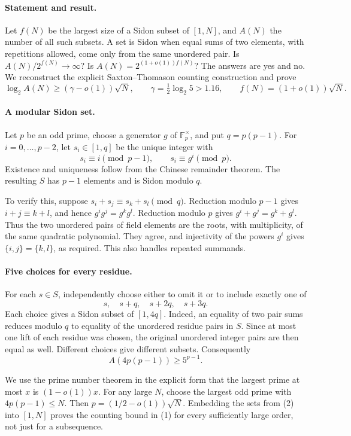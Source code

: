 \paragraph{Statement and result.}
Let \(f(N)\) be the largest size of a Sidon subset of \([1,N]\), and \(A(N)\) the number of all such subsets. A set is Sidon when equal sums of two elements, with repetitions allowed, come only from the same unordered pair. Is \(A(N)/2^{f(N)}\to\infty\)? Is \(A(N)=2^{(1+o(1))f(N)}\)? The answers are yes and no. We reconstruct the explicit Saxton--Thomason counting construction and prove
\[
 \log_2 A(N)\geq(\gamma-o(1))\sqrt N,
 \qquad \gamma=\tfrac12\log_2 5>1.16,
 \qquad f(N)=(1+o(1))\sqrt N.
\tag{1}
\]

\paragraph{A modular Sidon set.}
Let \(p\) be an odd prime, choose a generator \(g\) of \(\mathbb F_p^\times\), and put \(q=p(p-1)\). For \(i=0,\ldots,p-2\), let \(s_i\in[1,q]\) be the unique integer with
\[
 s_i\equiv i\pmod{p-1},\qquad s_i\equiv g^i\pmod p.
\]
Existence and uniqueness follow from the Chinese remainder theorem. The resulting \(S\) has \(p-1\) elements and is Sidon modulo \(q\).

To verify this, suppose \(s_i+s_j\equiv s_k+s_l\pmod q\). Reduction modulo \(p-1\) gives \(i+j\equiv k+l\), and hence \(g^ig^j=g^kg^l\). Reduction modulo \(p\) gives \(g^i+g^j=g^k+g^l\). Thus the two unordered pairs of field elements are the roots, with multiplicity, of the same quadratic polynomial. They agree, and injectivity of the powers \(g^i\) gives \(\{i,j\}=\{k,l\}\), as required. This also handles repeated summands.

\paragraph{Five choices for every residue.}
For each \(s\in S\), independently choose either to omit it or to include exactly one of
\[
 s,\quad s+q,\quad s+2q,\quad s+3q.
\]
Each choice gives a Sidon subset of \([1,4q]\). Indeed, an equality of two pair sums reduces modulo \(q\) to equality of the unordered residue pairs in \(S\). Since at most one lift of each residue was chosen, the original unordered integer pairs are then equal as well. Different choices give different subsets. Consequently
\[
 A(4p(p-1))\geq5^{p-1}.
\tag{2}
\]

We use the prime number theorem in the explicit form that the largest prime at most \(x\) is \((1-o(1))x\). For any large \(N\), choose the largest odd prime with \(4p(p-1)\leq N\). Then \(p=(1/2-o(1))\sqrt N\). Embedding the sets from (2) into \([1,N]\) proves the counting bound in (1) for every sufficiently large order, not just for a subsequence.

